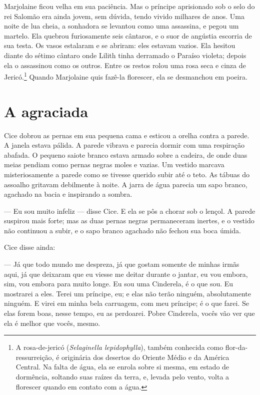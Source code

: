 Marjolaine ficou velha em sua paciência. Mas o príncipe aprisionado sob
o selo do rei Salomão era ainda jovem, sem dúvida, tendo vivido milhares
de anos. Uma noite de lua cheia, a sonhadora se levantou como uma
assassina, e pegou um martelo. Ela quebrou furiosamente seis cântaros, e o
suor de angústia escorria de sua testa. Os vasos estalaram e se abriram:
eles estavam vazios. Ela hesitou diante do sétimo cântaro onde Lilith
tinha derramado o Paraíso violeta; depois ela o assassinou como os outros.
Entre os restos rolou uma rosa seca e cinza de Jericó.\footnote{ A rosa-de-jericó 
(\textit{Selaginella lepidophylla}), também conhecida como flor-da-ressurreição, é originária dos
desertos do Oriente Médio e da América Central. Na falta
de água, ela se enrola sobre si mesma, em estado de dormência, soltando
suas raízes da terra, e, levada pelo vento, volta a florescer quando em
contato com a água.} Quando Marjolaine quis fazê-la florescer, ela se
desmanchou em poeira.

\section{A agraciada}

Cice dobrou as pernas em sua pequena cama e esticou a orelha contra a
parede. A janela estava pálida. A parede vibrava e parecia dormir com uma
respiração abafada. O pequeno saiote branco estava armado sobre a cadeira,
de onde duas meias pendiam como pernas negras moles e vazias. Um vestido
marcava misteriosamente a parede como se tivesse querido subir até o teto.
As tábuas do assoalho gritavam debilmente à noite. A
jarra de água parecia um sapo branco, agachado na bacia e inspirando a
sombra.

--- Eu sou muito infeliz --- disse Cice. E ela se pôs a chorar sob o
lençol. A parede suspirou mais forte; mas as duas pernas negras
permaneceram inertes, e o vestido não continuou a subir, e o sapo branco
agachado não fechou sua boca úmida.

Cice disse ainda:

--- Já que todo mundo me despreza, já que gostam somente de minhas irmãs
aqui, já que deixaram que eu viesse me deitar durante o jantar, eu vou
embora, sim, vou embora para muito longe. Eu sou uma Cinderela, é o que
sou. Eu mostrarei a eles. Terei um príncipe, eu; e elas não terão ninguém,
absolutamente ninguém. E virei em minha bela carruagem, com meu príncipe;
é o que farei. Se elas forem boas, nesse tempo, eu as perdoarei. Pobre
Cinderela, vocês vão ver que ela é melhor que vocês, mesmo.

